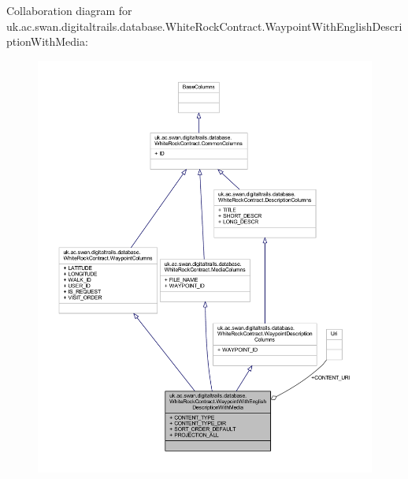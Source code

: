 Collaboration diagram for uk.\+ac.\+swan.\+digitaltrails.\+database.\+White\+Rock\+Contract.\+Waypoint\+With\+English\+Description\+With\+Media\+:
\nopagebreak
\begin{figure}[H]
\begin{center}
\leavevmode
\includegraphics[width=350pt]{classuk_1_1ac_1_1swan_1_1digitaltrails_1_1database_1_1_white_rock_contract_1_1_waypoint_with_enga82865afc7327fddc3fb875047b753d3}
\end{center}
\end{figure}
